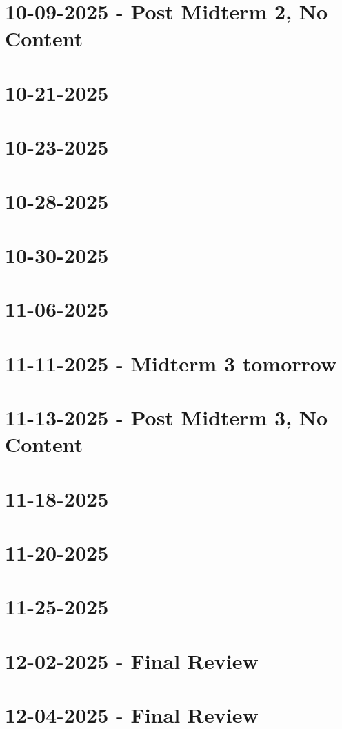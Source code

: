 \documentclass[]{mangos-musings}
\begin{document}


\newpage
\section*{10-09-2025 - Post Midterm 2, No Content}

\newpage
\section*{10-21-2025}

\newpage
\section*{10-23-2025}

\newpage
\section*{10-28-2025}

\newpage
\section*{10-30-2025}

\newpage
\section*{11-06-2025}

\newpage
\section*{11-11-2025 - Midterm 3 tomorrow}

\newpage
\section*{11-13-2025 - Post Midterm 3, No Content}

\newpage
\section*{11-18-2025}

\newpage
\section*{11-20-2025}

\newpage
\section*{11-25-2025}

\newpage
\section*{12-02-2025 - Final Review}

\newpage
\section*{12-04-2025 - Final Review}
\end{document}
